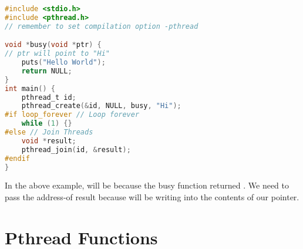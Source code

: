 \begin{lstlisting}[language=C]
#include <stdio.h>
#include <pthread.h>
// remember to set compilation option -pthread

void *busy(void *ptr) {
// ptr will point to "Hi"
    puts("Hello World");
    return NULL;
}
int main() {
    pthread_t id;
    pthread_create(&id, NULL, busy, "Hi");
#if loop_forever // Loop forever
    while (1) {}
#else // Join Threads
    void *result;
    pthread_join(id, &result);
#endif
}
\end{lstlisting}

In the above example,  will be  because the busy function returned . We need to pass the address-of result because  will be writing into the contents of our pointer.

\section{Pthread Functions}\label{more-pthread-functions}

